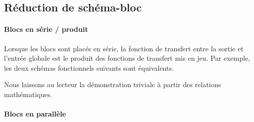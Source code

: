 \subsection{Réduction de schéma-bloc}

\paragraph{Blocs en série / produit}
Lorsque les blocs sont placés en série, la fonction de transfert 
entre la sortie et l'entrée globale est le produit des fonctions de 
transfert mis en jeu. Par exemple, les deux schémas fonctionnels suivants 
sont équivalents.

\begin{center}
\end{center}

\begin{center}
\end{center}

Nous laissons au lecteur la démonstration triviale à partir des relations 
mathématiques.


\paragraph{Blocs en parallèle} 


